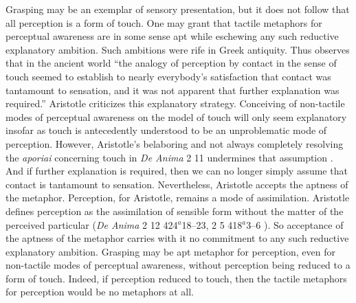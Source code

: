 

Grasping may be an exemplar of sensory presentation, but it does not follow that all perception is a form of touch. One may grant that tactile metaphors for perceptual awareness are in some sense apt while eschewing any such reductive explanatory ambition. Such ambitions were rife in Greek antiquity. Thus \citet[39]{Lindberg:1977aa} observes that in the ancient world ``the analogy of perception by contact in the sense of touch seemed to establish to nearly everybody’s satisfaction that contact was tantamount to sensation, and it was not apparent that further explanation was required.'' Aristotle criticizes this explanatory strategy. Conceiving of non-tactile modes of perceptual awareness on the model of touch will only seem explanatory insofar as touch is antecedently understood to be an unproblematic mode of perception. However, Aristotle's belaboring and not always completely resolving the \emph{aporiai} concerning touch in \emph{De Anima} 2 11 undermines that assumption \citep{Derrida:2005aa,Kalderon:2015fr}. And if further explanation is required, then we can no longer simply assume that contact is tantamount to sensation. Nevertheless, Aristotle accepts the aptness of the metaphor. Perception, for Aristotle, remains a mode of assimilation. Aristotle defines perception as the assimilation of sensible form without the matter of the perceived particular (\emph{De Anima} 2 12 424\( ^{a} \)18–23, 2 5 418\( ^{a} \)3–6 ). So acceptance of the aptness of the metaphor carries with it no commitment to any such reductive explanatory ambition. Grasping may be apt metaphor for perception, even for non-tactile modes of perceptual awareness, without perception being reduced to a form of touch. Indeed, if perception reduced to touch, then the tactile metaphors for perception would be no metaphors at all.

